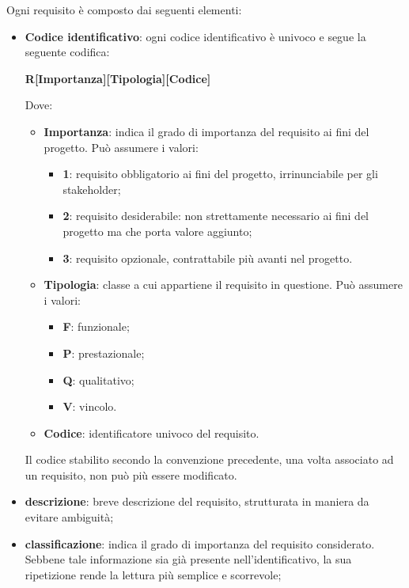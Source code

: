 \noindent Ogni requisito è composto dai seguenti elementi: 
\begin{itemize}
	\item{\textbf{Codice identificativo}}: ogni codice identificativo è univoco e segue la seguente codifica: 
		\begin{center}
			\textbf{R[Importanza][Tipologia][Codice]}
		\end{center}
		Dove:
		\begin{itemize}
			\item{\textbf{Importanza}: indica il grado di importanza del requisito ai fini del progetto. Può assumere i valori:}
			\begin{itemize}
				\item{\textbf{1}: requisito obbligatorio ai fini del progetto, irrinunciabile per gli stakeholder;}
				\item{\textbf{2}: requisito desiderabile: non strettamente necessario ai fini del progetto ma che porta valore aggiunto;}
				\item{\textbf{3}: requisito opzionale, contrattabile più avanti nel progetto.}
			\end{itemize}
		
			\item{\textbf{Tipologia}: classe a cui appartiene il requisito in questione. Può assumere i valori:}
			\begin{itemize}
				\item{\textbf{F}: funzionale;}
				\item{\textbf{P}: prestazionale;}
				\item{\textbf{Q}: qualitativo;}
				\item{\textbf{V}: vincolo.}
			\end{itemize}
			
			\item{\textbf{Codice}: identificatore univoco del requisito}.
		\end{itemize}
		
		\noindent Il codice stabilito secondo la convenzione precedente, una volta associato ad un requisito, non può più essere modificato.

	\item{\textbf{descrizione}}: breve descrizione del requisito, strutturata in maniera da evitare ambiguità; 
		
	\item{\textbf{classificazione}}: indica il grado di importanza del requisito considerato. Sebbene tale informazione sia già presente nell'identificativo, la sua ripetizione rende la lettura più semplice e scorrevole;	
	

\end{itemize}
